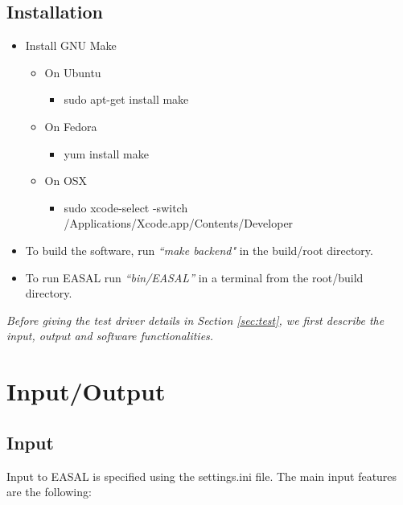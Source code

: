 \documentclass[10pt]{article}
\begin{document}
\subsection{Installation}
\label{sec:installation}
\begin{itemize}
	 \item Install GNU Make
	   \begin{itemize}
	   	   \item On Ubuntu 
	   	   \begin{itemize}
			\item sudo apt-get install make
		   \end{itemize}	
		   \item On Fedora
		   \begin{itemize}
			\item yum install make
		   \end{itemize}
		   \item On OSX
		   \begin{itemize}
		   \item sudo xcode-select -switch /Applications/Xcode.app/Contents/Developer
		   \end{itemize}
		   \end{itemize}
	 
	 \item To build the software, run \emph{``make backend"} in the build/root directory.
	 \item To run EASAL run \emph{``bin/EASAL''} in a terminal from the root/build directory.
\end{itemize}%

\emph{Before giving the test driver details in Section \ref{sec:test}, we first describe
the input, output and software functionalities.}

\section{Input/Output}
\label{sec:io}
\subsection{Input}
Input to EASAL is specified using the settings.ini file. The main input features are the following:
\end{document}
